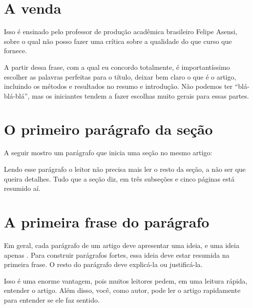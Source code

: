 \documentclass[openany]{book}
\begin{document}
\section{A venda}

 Isso é ensinado pelo professor de produção acadêmica brasileiro  Felipe Asensi, sobre o qual não posso fazer uma crítica sobre a qualidade do que curso que fornece.

A partir dessa frase, com a qual eu concordo totalmente, é importantíssimo escolher as palavras perfeitas para o título, deixar bem claro o que é o artigo, incluindo os métodos e resultados no resumo e introdução. Não podemos ter ``blá-blá-blá'', mas os iniciantes tendem a fazer escolhas muito gerais para essas partes.

\section{O primeiro parágrafo da seção}

  A seguir mostro um parágrafo que inicia uma seção no mesmo artigo:


Lendo esse parágrafo o leitor não precisa mais ler o resto da seção, a não ser que queira detalhes. Tudo que a seção diz, em três subseções e cinco páginas está resumido aí.

\section{A primeira frase do parágrafo}

 Em geral, cada parágrafo de um artigo deve apresentar uma ideia, e uma ideia apenas . Para construir parágrafos fortes, essa ideia deve estar resumida na primeira frase. O resto do parágrafo deve explicá-la ou justificá-la.

 Isso é uma enorme vantagem, pois muitos leitores pedem, em uma leitura rápida, entender o artigo. Além disso, você, como autor, pode ler o artigo rapidamente para entender se ele faz sentido.
\end{document}
